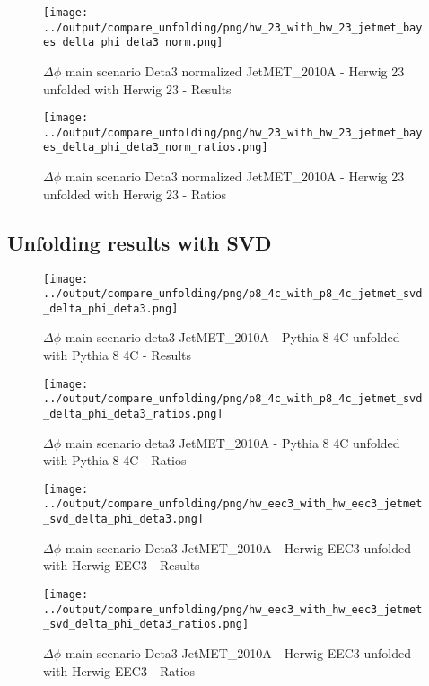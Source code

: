 \documentclass[11pt]{book}
\begin{document}
\begin{figure}[ht]
\centering
\texttt{[image: ../output/compare\_unfolding/png/hw\_23\_with\_hw\_23\_jetmet\_bayes\_delta\_phi\_deta3\_norm.png]}
\caption{$\Delta\phi$ main scenario Deta3 normalized JetMET\_2010A - Herwig 23 unfolded with Herwig 23 - Results}
\label{hw_23_hw_23_jetmet_bayes_delta_phi_deta3_norm_a}
\end{figure}

\begin{figure}[ht]
\centering
\texttt{[image: ../output/compare\_unfolding/png/hw\_23\_with\_hw\_23\_jetmet\_bayes\_delta\_phi\_deta3\_norm\_ratios.png]}
\caption{$\Delta\phi$ main scenario Deta3 normalized JetMET\_2010A - Herwig 23 unfolded with Herwig 23 - Ratios}
\label{hw_23_hw_23_jetmet_bayes_delta_phi_deta3_norm_b}
\end{figure}



\clearpage
\subsection{Unfolding results with SVD}

\begin{figure}[ht]
\centering
\texttt{[image: ../output/compare\_unfolding/png/p8\_4c\_with\_p8\_4c\_jetmet\_svd\_delta\_phi\_deta3.png]}
\caption{$\Delta\phi$ main scenario deta3 JetMET\_2010A - Pythia 8 4C unfolded with Pythia 8 4C - Results}
\label{p8_p8_jetmet_svd_delta_phi_deta3_a}
\end{figure}

\begin{figure}[ht]
\centering
\texttt{[image: ../output/compare\_unfolding/png/p8\_4c\_with\_p8\_4c\_jetmet\_svd\_delta\_phi\_deta3\_ratios.png]}
\caption{$\Delta\phi$ main scenario deta3 JetMET\_2010A - Pythia 8 4C unfolded with Pythia 8 4C - Ratios}
\label{p8_p8_jetmet_svd_delta_phi_deta3_b}
\end{figure}

\begin{figure}[ht]
\centering
\texttt{[image: ../output/compare\_unfolding/png/hw\_eec3\_with\_hw\_eec3\_jetmet\_svd\_delta\_phi\_deta3.png]}
\caption{$\Delta\phi$ main scenario Deta3 JetMET\_2010A - Herwig EEC3 unfolded with Herwig EEC3 - Results}
\label{hw_eec3_hw_eec3_jetmet_svd_delta_phi_deta3_a}
\end{figure}

\begin{figure}[ht]
\centering
\texttt{[image: ../output/compare\_unfolding/png/hw\_eec3\_with\_hw\_eec3\_jetmet\_svd\_delta\_phi\_deta3\_ratios.png]}
\caption{$\Delta\phi$ main scenario Deta3 JetMET\_2010A - Herwig EEC3 unfolded with Herwig EEC3 - Ratios}
\label{hw_eec3_hw_eec3_jetmet_svd_delta_phi_deta3_b}
\end{figure}
\end{document}
